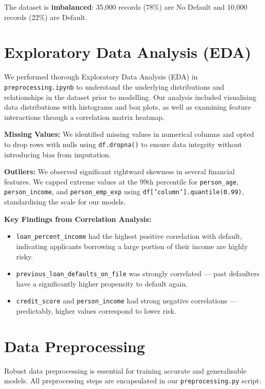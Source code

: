 \documentclass[12pt, a4paper]{article}
\begin{document}
The dataset is \textbf{imbalanced}: 35,000 records (78\%) are No Default and 10,000 records (22\%) are Default.

\section{Exploratory Data Analysis (EDA)}

We performed thorough Exploratory Data Analysis (EDA) in \texttt{preprocessing.ipynb} to understand the underlying distributions and relationships in the dataset prior to modelling. Our analysis included visualising data distributions with histograms and box plots, as well as examining feature interactions through a correlation matrix heatmap.

\textbf{Missing Values:} We identified missing values in numerical columns and opted to drop rows with nulls using \texttt{df.dropna()} to ensure data integrity without introducing bias from imputation.

\textbf{Outliers:} We observed significant rightward skewness in several financial features. We capped extreme values at the 99th percentile for \texttt{person\_age}, \texttt{person\_income}, and \texttt{person\_emp\_exp} using \texttt{df['column'].quantile(0.99)}, standardising the scale for our models.

\textbf{Key Findings from Correlation Analysis:}
\begin{itemize}[leftmargin=2cm]
  \item \texttt{loan\_percent\_income} had the highest positive correlation with default, indicating applicants borrowing a large portion of their income are highly risky.
  \item \texttt{previous\_loan\_defaults\_on\_file} was strongly correlated --- past defaulters have a significantly higher propensity to default again.
  \item \texttt{credit\_score} and \texttt{person\_income} had strong negative correlations --- predictably, higher values correspond to lower risk.
\end{itemize}

\section{Data Preprocessing}

Robust data preprocessing is essential for training accurate and generalisable models. All preprocessing steps are encapsulated in our \texttt{preprocessing.py} script:
\end{document}
